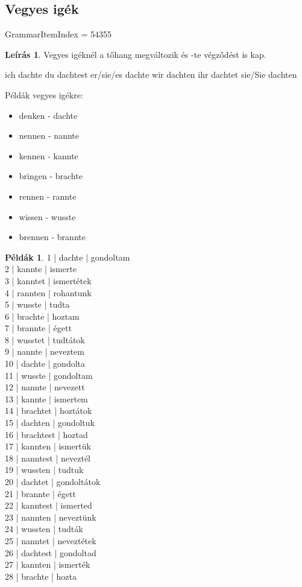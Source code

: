 \documentclass{article}
\theoremstyle{definition}
\newtheorem*{exmp}{Példák}
\newtheorem*{desc}{Leírás}
\begin{document}
\subsection{Vegyes igék}

GrammarItemIndex = 54355

\begin{desc}
Vegyes igéknél a tőhang megváltozik és -te végződést is kap.

ich dachte
du dachtest
er/sie/es dachte
wir dachten
ihr dachtet
sie/Sie dachten

Példák vegyes igékre:
\begin{itemize}
\item denken - dachte
\item nennen - nannte
\item kennen - kannte
\item bringen - brachte
\item rennen - rannte
\item wissen - wusste
\item brennen - brannte
\end{itemize}
\end{desc}

\begin{exmp}
1 | dachte | gondoltam\\
2 | kannte | ismerte\\
3 | kanntet | ismertétek\\
4 | rannten | rohantunk\\
5 | wusste | tudta\\
6 | brachte | hoztam\\
7 | brannte | égett\\
8 | wusstet | tudtátok\\
9 | nannte | neveztem\\
10 | dachte | gondolta\\
11 | wusste | gondoltam\\
12 | nannte | nevezett\\
13 | kannte | ismertem\\
14 | brachtet | hoztátok\\
15 | dachten | gondoltuk\\
16 | brachtest | hoztad\\
17 | kannten | ismertük\\
18 | nanntest | neveztél\\
19 | wussten | tudtuk\\
20 | dachtet | gondoltátok\\
21 | brannte | égett\\
22 | kanntest | ismerted\\
23 | nannten | neveztünk\\
24 | wussten | tudták\\
25 | nanntet | neveztétek\\
26 | dachtest | gondoltad\\
27 | kannten | ismerték\\
28 | brachte | hozta\\
\end{exmp}
\end{document}
